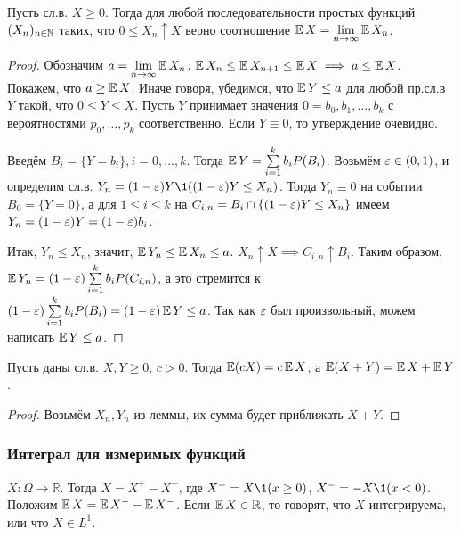     \begin{lemma}\label{lect07:lemma2}
        Пусть сл.в. $X\ge 0$. Тогда для любой последовательности простых функций $(X_n)_{n\in\mathbb{N}}$ таких, что $0\le X_n\uparrow X$ верно соотношение $\operatorname*{\mathbb{E}} X = \lim\limits_{n\to\infty}{\operatorname*{\mathbb{E}} X_n}$.
    \end{lemma}
    \begin{proof}
        Обозначим $a=\lim\limits_{n\to\infty}{\operatorname*{\mathbb{E}} X_n}$. $\operatorname*{\mathbb{E}} X_n \le \operatorname*{\mathbb{E}} X_{n+1} \le \operatorname*{\mathbb{E}} X \implies a\le\operatorname*{\mathbb{E}} X$. Покажем, что $a\ge\operatorname*{\mathbb{E}} X$. Иначе говоря, убедимся, что $\operatorname*{\mathbb{E}} Y\le a$ для любой пр.сл.в $Y$ такой, что $0\le Y\le X$. Пусть $Y$ принимает значения $0=b_0,b_1,\ldots,b_k$ с вероятностями $p_0,\ldots,p_k$ соответственно. Если $Y\equiv 0$, то утверждение очевидно.
        
        Введём $B_i = \{Y=b_i\}, i=0,\ldots,k$. Тогда $\operatorname*{\mathbb{E}} Y = \sum\limits_{i=1}^{k} b_i P(B_i)$. Возьмём $\varepsilon\in(0,1)$, и определим сл.в. $Y_n = (1-\eps)Y \1 ((1-\eps)Y\le X_n)$. Тогда $Y_n\equiv 0$ на событии $B_0 = \{Y=0\}$, а для $1\le i\le k$ на $C_{i,n}=B_i\cap\{ (1-\varepsilon)Y\le X_n\}$ имеем $Y_n = (1-\varepsilon)Y = (1-\varepsilon)b_i$.
        
        Итак, $Y_n\le X_n$, значит, $\operatorname*{\mathbb{E}} Y_n\le\operatorname*{\mathbb{E}} X_n\le a$. $X_n\uparrow X \implies C_{i,n}\uparrow B_i$. Таким образом, $\operatorname*{\mathbb{E}} Y_n = (1-\varepsilon)\sum\limits_{i=1}^{k}b_i P(C_{i,n})$, а это стремится к $(1-\varepsilon)\sum\limits_{i=1}^{k}b_i P(B_i) = (1-\varepsilon)\operatorname*{\mathbb{E}} Y\le a$. Так как $\varepsilon$ был произвольный, можем написать $\operatorname*{\mathbb{E}} Y\le a$.
    \end{proof}
    
    \begin{col}\label{lect07:col2}
        Пусть даны сл.в. $X,Y\ge 0$, $c>0$. Тогда $\operatorname*{\mathbb{E}} (cX) = c\operatorname*{\mathbb{E}} X$, а $\operatorname*{\mathbb{E}} (X+Y) = \operatorname*{\mathbb{E}} X + \operatorname*{\mathbb{E}} Y$.
    \end{col}
    \begin{proof}
        Возьмём $X_n, Y_n$ из леммы, их сумма будет приближать $X+Y$.
    \end{proof}
    
    \subsubsection{Интеграл для измеримых функций}
    \begin{definition}\label{lect07:def4}
        $X:\Omega\to\mathbb{R}$. Тогда $X=X^{+}-X^{-}$, где $X^{+}=X\1 (x\ge 0)$, $X^{-}=-X\1 (x<0)$. Положим $\operatorname*{\mathbb{E}} X = \operatorname*{\mathbb{E}} X^{+} - \operatorname*{\mathbb{E}} X^{-}$. Если $\operatorname*{\mathbb{E}} X\in\mathbb{R}$, то говорят, что $X$ интегрируема, или что $X\in L^1$.
    \end{definition}
    
